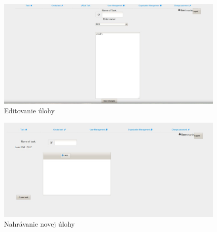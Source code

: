 {\begin{figure}[htb]
\begin{center}

\includegraphics[scale=0.4]{page1.jpg} 
\caption{Editovanie úlohy}


\end{center}

\end{figure}

\begin{figure}[htb]

\begin{center}

\includegraphics[scale=0.4]{page2.jpg} 
\caption{Nahrávanie novej úlohy}



\end{center}

\end{figure}


\begin{figure}[htb]

\begin{center}


\end{center}
\end{figure}}
